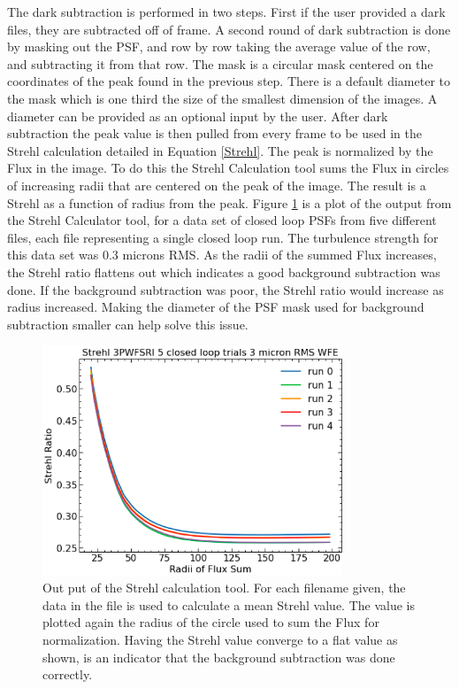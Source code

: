 \documentclass[12pt]{spieman}  %
\begin{document}
\begin{spacing}{2}
The dark subtraction is performed in two steps. First if the user provided a dark files, they are subtracted off of frame. A second round of dark subtraction is done by masking out the PSF, and row by row taking the average value of the row, and subtracting it from that row. The mask is a circular mask centered on the coordinates of the peak found in the previous step. There is a default diameter to the mask which is one third the size of the smallest dimension of the images. A diameter can be provided as an optional input by the user. After dark subtraction the peak value is then pulled from every frame to be used in the Strehl calculation detailed in Equation \ref{Strehl}. The peak is normalized by the Flux in the image. To do this the Strehl Calculation tool sums the Flux in circles of increasing radii that are centered on the peak of the image. The result is a Strehl as a function of radius from the peak. Figure \ref{fig:StrehlVsRadiiExample} is a plot of the output from the Strehl Calculator tool, for a data set of closed loop PSFs from five different files, each file representing a single closed loop run. The turbulence strength for this data set was 0.3 microns RMS. As the radii of the summed Flux increases, the Strehl ratio flattens out which indicates a good background subtraction was done. If the background subtraction was poor, the Strehl ratio would increase as radius increased. Making the diameter of the PSF mask used for background subtraction smaller can help solve this issue. 

\begin{figure}
    \centering
    \includegraphics[width=0.8\textwidth]{StrehlVsRadiiExample.png}
    \caption{Out put of the Strehl calculation tool. For each filename given, the data in the file is used to calculate a mean Strehl value. The value is plotted again the radius of the circle used to sum the Flux for normalization. Having the Strehl value converge to a flat value as shown, is an indicator that the background subtraction was done correctly. }
    \label{fig:StrehlVsRadiiExample}
\end{figure}






\end{spacing}
\end{document}
